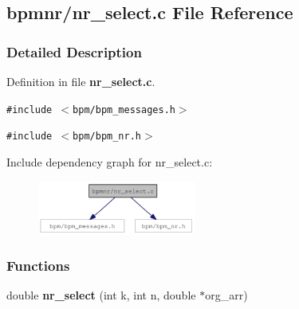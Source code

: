 \subsection{bpmnr/nr\_\-select.c File Reference}
\label{nr__select_8c}


\subsubsection{Detailed Description}


Definition in file {\bf nr\_\-select.c}.

{\tt \#include $<$bpm/bpm\_\-messages.h$>$}\par
{\tt \#include $<$bpm/bpm\_\-nr.h$>$}\par


Include dependency graph for nr\_\-select.c:\nopagebreak
\begin{figure}[H]
\begin{center}
\leavevmode
\includegraphics[width=147pt]{nr__select_8c__incl}
\end{center}
\end{figure}
\subsubsection*{Functions}
\begin{CompactItemize}
\item 
double {\bf nr\_\-select} (int k, int n, double $\ast$org\_\-arr)
\end{CompactItemize}

